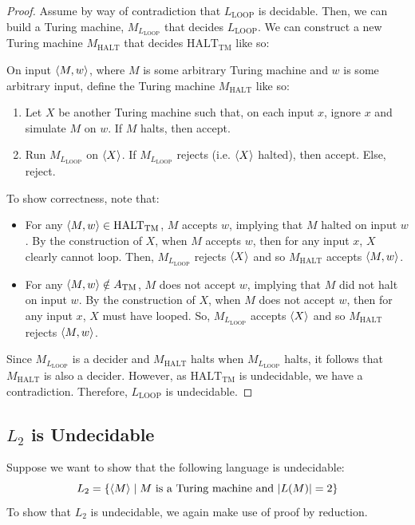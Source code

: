 \documentclass[letterpaper]{article}
\begin{document}
\begin{mdframed}[]
    \begin{proof}
        Assume by way of contradiction that $L_{\text{LOOP}}$ is decidable. Then, we can build a Turing machine, $M_{L_{\text{LOOP}}}$ that decides $L_{\text{LOOP}}$. We can construct a new Turing machine $M_{\text{HALT}}$ that decides $\text{HALT}_{\text{TM}}$ like so:
        \begin{mdframed}[]
            On input $\langle M, w \rangle$, where $M$ is some arbitrary Turing machine and $w$ is some arbitrary input, define the Turing machine $M_{\text{HALT}}$ like so: 
            \begin{enumerate}
                \item Let $X$ be another Turing machine such that, on each input $x$, ignore $x$ and simulate $M$ on $w$. If $M$ halts, then accept. 
                \item Run $M_{L_\text{LOOP}}$ on $\langle X \rangle$. If $M_{L_{\text{LOOP}}}$ rejects (i.e. $\langle X \rangle$ halted), then accept. Else, reject.
            \end{enumerate}
        \end{mdframed}
        To show correctness, note that: 
        \begin{itemize}
            \item For any $\langle M, w \rangle \in \text{HALT}_{\text{TM}}$, $M$ accepts $w$, implying that $M$ halted on input $w$. By the construction of $X$, when $M$ accepts $w$, then for any input $x$, $X$ clearly cannot loop. Then, $M_{L_{\text{LOOP}}}$ rejects $\langle X \rangle$ and so $M_{\text{HALT}}$ accepts $\langle M, w \rangle$. 
            \item For any $\langle M, w \rangle \notin A_{\text{TM}}$, $M$ does not accept $w$, implying that $M$ did not halt on input $w$. By the construction of $X$, when $M$ does not accept $w$, then for any input $x$, $X$ must have looped. So, $M_{L_{\text{LOOP}}}$ accepts $\langle X \rangle$ and so $M_{\text{HALT}}$ rejects $\langle M, w \rangle$. 
        \end{itemize}
        Since $M_{L_{\text{LOOP}}}$ is a decider and $M_{\text{HALT}}$ halts when $M_{L_{\text{LOOP}}}$ halts, it follows that $M_{\text{HALT}}$ is also a decider. However, as $\text{HALT}_{\text{TM}}$ is undecidable, we have a contradiction. Therefore, $L_{\text{LOOP}}$ is undecidable. 
    \end{proof}
\end{mdframed}

\subsection{\texorpdfstring{$L_2$}{} is Undecidable}
Suppose we want to show that the following language is undecidable:
\[L_2 = \{\langle M \rangle \mid M \text{ is a Turing machine and } |L(M)| = 2\}\]
To show that $L_2$ is undecidable, we again make use of proof by reduction.
\end{document}
